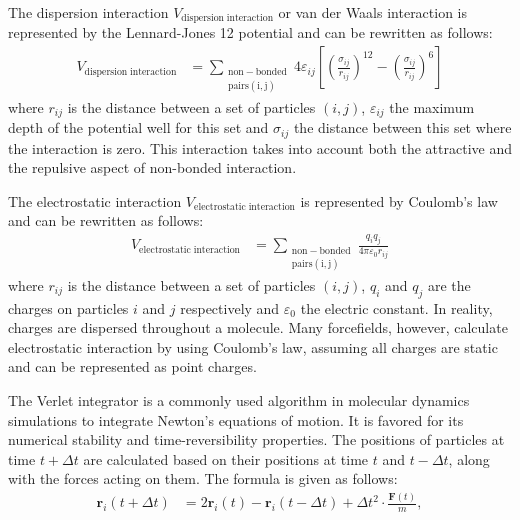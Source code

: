 \documentclass[conference]{IEEEtran}
\begin{document}
The dispersion interaction $V_{\mathrm{dispersion \; interaction}}$ or van der Waals interaction is represented by 
the Lennard-Jones 12 potential and can be rewritten as follows:
\begin{equation}
    \begin{aligned}
    V_{\mathrm{dispersion \; interaction}} &= \sum_{\mathrm{\substack{\mathrm{non-bonded} \\ \mathrm{pairs(i,j)}}}} 4\varepsilon_{ij}\left[
    {\left(\frac{\sigma_{ij}}{r_{ij}}\right)}^{12} - {\left(\frac{\sigma_{ij}}{r_{ij}}\right)}^6
    \right]
    \end{aligned}
\end{equation}
where $r_{ij}$ is the distance between a set of particles $(i,j)$, $\varepsilon_{ij}$ the maximum depth of the 
potential well for this set and $\sigma_{ij}$ the distance between this set where the interaction is zero. This 
interaction takes into account both the attractive and the repulsive aspect of non-bonded interaction. 

The electrostatic interaction $V_{\mathrm{electrostatic \; interaction}}$ is represented by Coulomb's law and can 
be rewritten as follows: 
\begin{equation}
    \begin{aligned}
    V_{\mathrm{electrostatic \; interaction}} &= \sum_{\mathrm{\substack{\mathrm{non-bonded} \\ \mathrm{pairs(i,j)}}}} \frac{q_i q_j}{4\pi\varepsilon_0r_{ij}}
    \end{aligned}
\end{equation}
where $r_{ij}$ is the distance between a set of particles $(i,j)$, $q_i$ and $q_j$ are the charges on particles $i$ 
and $j$ respectively and $\varepsilon_0$ the electric constant. In reality, charges are dispersed throughout a 
molecule. Many forcefields, however, calculate electrostatic interaction by using Coulomb's law, assuming all charges 
are static and can be represented as point charges. 

The Verlet integrator is a commonly used algorithm in molecular dynamics simulations to integrate Newton's equations 
of motion. It is favored for its numerical stability and time-reversibility properties. The positions of particles 
at time \( t + \Delta t \) are calculated based on their positions at time \( t \) and \( t - \Delta t \), along 
with the forces acting on them. The formula is given as follows:
\begin{align}
    \mathbf{r}_i(t + \Delta t) &= 2\mathbf{r}_i(t) - \mathbf{r}_i(t - \Delta t) + \Delta t^2 \cdot \frac{\mathbf{F}(t)}{m},
\end{align}
\end{document}
